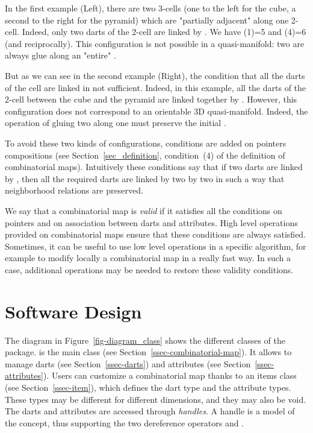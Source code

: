 In the first example (Left), there are two 3-cells (one to the left
for the cube, a second to the right for the pyramid) which are
"partially adjacent" along one 2-cell. Indeed, only two darts
of the 2-cell are linked by \betatrois{}. We have \betatrois{}(1)=5 and
\betatrois{}(4)=6 (and reciprocally).  This configuration is not possible
in a quasi-manifold: two  are always glue along an "entire"
.

But as we can see in the second example (Right), the condition that
all the darts of the cell are linked in not sufficient. Indeed, in
this example, all the darts of the 2-cell between the cube and the
pyramid are linked together by \betatrois{}. However, this configuration
does not correspond to an orientable 3D quasi-manifold. Indeed, the
operation of gluing two  along one  must
preserve the initial .

To avoid these two kinds of configurations, conditions are added on
\betats{} pointers compositions (see Section~\ref{sec_definition},
condition~(4) of the definition of combinatorial maps). Intuitively
these conditions say that if two darts are linked by \betai{}, then
all the required darts are linked by \betai{} two by two in such a
way that neighborhood relations are preserved.


We say that a combinatorial map is \emph{valid} if it satisfies all
the conditions on \betats{} pointers and on association between darts
and attributes.  High level operations provided on combinatorial maps
ensure that these conditions are always satisfied. Sometimes, it can
be useful to use low level operations in a specific algorithm, for
example to modify locally a combinatorial map in a really fast way. In
such a case, additional operations may be needed to restore these
validity conditions.


\section{Software Design}\label{sec-software-design}
The diagram in Figure~\ref{fig-diagram_class} shows the different
classes of the package.   is the main class
(see Section~\ref{ssec-combinatorial-map}). It allows to manage darts
(see Section~\ref{ssec-darts}) and attributes (see
Section~\ref{ssec-attributes}).
Users can customize a combinatorial map thanks to an items class (see
Section~\ref{ssec-item}), which defines the dart type and the
attribute types. These types may be different for different
dimensions, and they may also be void.  The darts and attributes are
accessed through \emph{handles}. A handle is a model of the
 concept, thus supporting the two dereference operators
 and .

